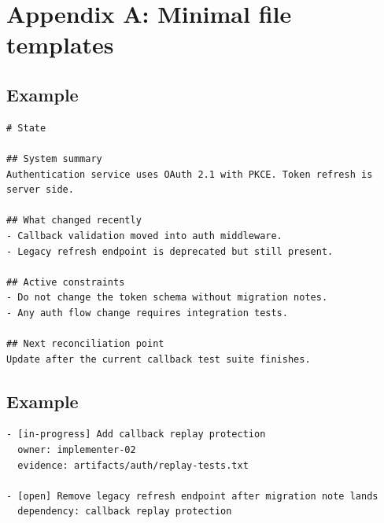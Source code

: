 
\section{Appendix A: Minimal file templates}

\subsection*{Example }
\begin{lstlisting}
# State

## System summary
Authentication service uses OAuth 2.1 with PKCE. Token refresh is server side.

## What changed recently
- Callback validation moved into auth middleware.
- Legacy refresh endpoint is deprecated but still present.

## Active constraints
- Do not change the token schema without migration notes.
- Any auth flow change requires integration tests.

## Next reconciliation point
Update after the current callback test suite finishes.
\end{lstlisting}

\subsection*{Example }
\begin{lstlisting}
- [in-progress] Add callback replay protection
  owner: implementer-02
  evidence: artifacts/auth/replay-tests.txt

- [open] Remove legacy refresh endpoint after migration note lands
  dependency: callback replay protection
\end{lstlisting}

